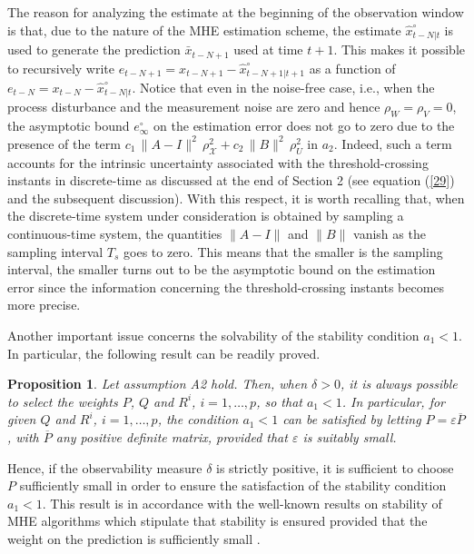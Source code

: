 \documentclass[11pt,journal,onecolumn]{IEEEtran}
\newtheorem{proposition}{Proposition}
\begin{document}
The reason for analyzing the estimate at the beginning of the observation window is that, due to the nature of the MHE estimation scheme, the estimate $\hat x^\circ_{t-N|t}$ is used to generate the prediction $\bar x_{t-N+1}$ used at time $t+1$. This makes it possible to recursively write $e_{t-N+1} = x_{t-N+1} - \hat x^\circ_{t-N+1|t+1}$ as a function of $e_{t-N} = x_{t-N} - \hat x^\circ_{t-N|t}$. Notice that even in the noise-free case, i.e., when the process disturbance and the measurement noise are zero and hence $\rho_W = \rho_V = 0$, the asymptotic bound $e_\infty^{\circ}$ on the estimation error does not go to zero due to the presence of the term $c_1 \, \| A-I \|^2 \, \rho^2_{\mathcal X}  + c_2 \, \| B \|^2 \, \rho_U^2$ in $a_2$. Indeed, such a term accounts for the intrinsic uncertainty associated with the threshold-crossing instants in discrete-time as discussed at the end of Section 2 (see equation (\ref{29}) and the subsequent discussion). With this respect, it is worth recalling that, when the discrete-time system under consideration is obtained by sampling a continuous-time system, the quantities $\| A-I \|$ and $\| B \|$ vanish as the sampling interval $T_s$ goes to zero. This means that the smaller is the sampling interval, the smaller turns out to be the asymptotic bound on the estimation error since the information concerning the threshold-crossing instants becomes more precise.

Another important issue concerns the solvability of the stability condition $a_1 <1$. In particular, the following result can be readily proved.
 \vspace{.3cm}
\begin{proposition}\label{proposition2}
Let assumption A2 hold. Then, when $\delta >0$,  it is always possible to select the weights $P$, $Q$ and $R^{i}$, $i=1,\ldots,p$, so that $a_{1}<1$. In particular, for given $Q$ and $R^{i}$, $i=1,\ldots,p$, the condition $a_{1}<1$ can be satisfied by letting $P = \varepsilon \overline{P}$, with $\overline{P}$ any positive definite matrix, provided that $\varepsilon$ is suitably small.
\end{proposition}
\vspace{.3cm}

Hence, if the observability measure $\delta$ is strictly positive, it is sufficient to choose $P$ sufficiently small in order to ensure the satisfaction of the stability condition $a_1 <1$.  This result is in accordance with the well-known results on stability of MHE algorithms which stipulate that stability is ensured provided that the weight on the prediction is sufficiently small \cite{NLMHE}.
\end{document}
